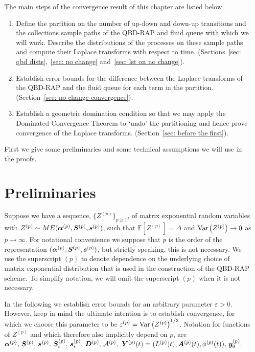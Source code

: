 The main steps of the convergence result of this chapter are listed below.
\begin{enumerate}
	\item\label{step 1} Define the partition on the number of up-down and down-up transitions and the collections sample paths of the QBD-RAP and fluid queue with which we will work. Describe the distributions of the processes on these sample paths and compute their Laplace transforms with respect to time. (Sections~\ref{sec: qbd dists},~\ref{sec: no change} and~\ref{sec: lst on no change}).
	\item\label{step 2} Establish error bounds for the difference between the Laplace transforms of the QBD-RAP and the fluid queue for each term in the partition. (Section~\ref{sec: no change convergence}).
	\item\label{step 3} Establish a geometric domination condition so that we may apply the Dominated Convergence Theorem to `undo' the partitioning and hence prove convergence of the Laplace transforms. (Section~\ref{sec: before the first}).
\end{enumerate}

First we give some preliminaries and some technical assumptions we will use in the proofs. 

\section*{Preliminaries}
Suppose we have a sequence, \(\{Z^{(p)}\}_{p\geq 1}\), of matrix exponential random variables with \(Z^{(p)}\sim ME(\boldsymbol\alpha^{(p)},\boldsymbol S^{(p)}, \boldsymbol s^{(p)})\), such that \(\mathbb E[Z^{(p)}] = \Delta\) and \(\mathrm{Var}\left(Z^{(p)}\right)\to 0 \) as \(p\to \infty\). For notational convenience we suppose that \(p\) is the order of the representation \((\boldsymbol\alpha^{(p)},\boldsymbol S^{(p)}, \boldsymbol s^{(p)})\), but strictly speaking, this is not necessary. We use the superscript \((p)\) to denote dependence on the underlying choice of matrix exponential distribution that is used in the construction of the QBD-RAP scheme. To simplify notation, we will omit the superscript \((p)\) when it is not necessary. 

In the following we establish error bounds for an arbitrary parameter \(\varepsilon>0\). However, keep in mind the ultimate intention is to establish convergence, for which we choose this parameter to be \(\varepsilon^{(p)}=\mathrm{Var}\left(Z^{(p)}\right)^{1/3}\). Notation for functions of \(Z^{(p)}\) and which therefore also implicitly depend on \(p\), are \(\boldsymbol\alpha^{(p)},\,\boldsymbol S^{(p)},\,\boldsymbol s^{(p)},\, \boldsymbol S_i^{(p)},\, \boldsymbol s_i^{(p)},\, \boldsymbol D^{(p)},\,\mathcal A^{(p)},\) \(\boldsymbol Y^{(p)}(t) = (L^{(p)}(t),\boldsymbol A^{(p)}(t), \phi^{(p)}(t)),\, \boldsymbol y_0^{(p)}.\)

